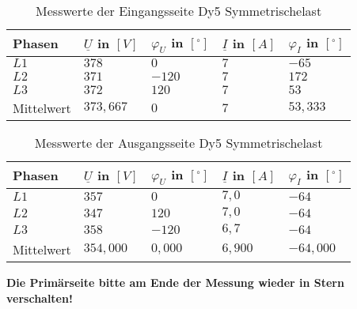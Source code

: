 \begin{enumerate}[label=\alph*)]
        \begin{table}[h!]
          \caption{Messwerte der Eingangsseite Dy5 Symmetrischelast}
          \centering
          \begin{tabular}{lllll}
            \\ \hline
            Phasen     & $\underline{U}$ in $[V]$ & $\varphi_{U}$ in $[^\circ]$ & $\underline{I}$ in $[A]$ & $\varphi_{I}$ in $[^\circ]$ \\ \hline
            $L1$       & $378$                    & $0$                         & $7$                      & $-65$                       \\
            $L2$       & $371$                    & $-120$                      & $7$                      & $172$                       \\
            $L3$       & $372$                    & $120$                       & $7$                      & $53$                        \\ \hline
            Mittelwert & $373,667$                & $0$                         & $7$                      & $53,333$                    \\ \hline\hline
          \end{tabular}
        \end{table}
        \begin{table}[h!]
          \centering
          \caption{Messwerte der Ausgangsseite Dy5 Symmetrischelast}
          \begin{tabular}{lllll}
            \\ \hline
            Phasen     & $\underline{U}$ in $[V]$ & $\varphi_{U}$ in $[^\circ]$ & $\underline{I}$ in $[A]$ & $\varphi_{I}$ in $[^\circ]$ \\ \hline
            $L1$       & $357$                    & $0$                         & $7,0$                    & $-64$                       \\
            $L2$       & $347$                    & $120$                       & $7,0$                    & $-64$                       \\
            $L3$       & $358$                    & $-120$                      & $6,7$                    & $-64$                       \\ \hline
            Mittelwert & $354,000$                & $0,000$                     & $6,900$                  & $-64,000$                   \\ \hline\hline
          \end{tabular}
        \end{table}
\end{enumerate}
\textbf{Die Primärseite bitte am Ende der Messung wieder in Stern verschalten! }
